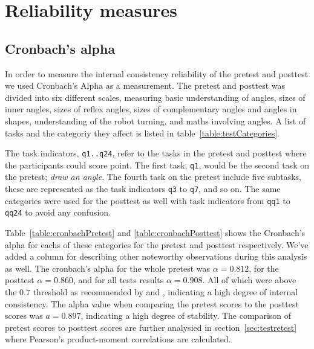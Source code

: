 \chapter{Reliability measures}\label{ch:cronbach}
\section{Cronbach's alpha}
In order to measure the internal consistency reliability of the pretest and posttest we used Cronbach's Alpha as a measurement. 
The pretest and posttest was divided into six different scales, measuring
basic understanding of angles, sizes of inner angles, sizes of reflex angles, sizes of complementary angles and angles in shapes, understanding of the robot turning, and maths involving angles. A list of tasks and the categoriy they affect is listed in table~\ref{table:testCategories}. 

\bigskip\noindent
The task indicators, \texttt{q1..q24}, refer to the tasks in the pretest and posttest where the participants could score point. The first task, \texttt{q1}, would be the second task on the pretest; \textit{draw an angle}. The fourth task on the pretest include five subtasks, these are represented as the task indicators \texttt{q3} to \texttt{q7}, and so on.
The same categories were used for the posttest as well with task indicators from \texttt{qq1} to \texttt{qq24} to avoid any confusion.


\bigskip\noindent
Table~\ref{table:cronbachPretest} and \ref{table:cronbachPosttest} shows the Cronbach's alpha for eachs of these categories for the pretest and posttest respectively. We've added a column for describing other noteworthy observations during this analysis as well. 
The cronbach's alpha for the whole pretest was $\alpha = 0.812$, for the posttest $\alpha = 0.860$, and for all tests results $\alpha = 0.908$.
All of which were above the $0.7$ threshold as recommended by \cite{devellis2003scale} and \cite{kline2005principles}, indicating a high degree of internal consistency. The alpha value when comparing the pretest scores to the posttest scores was $a = 0.897$, indicating a high degree of stability.	The comparison of pretest scores to posttest scores are further analysied in section~\ref{sec:testretest} where Pearson's product-moment correlations are calculated.


